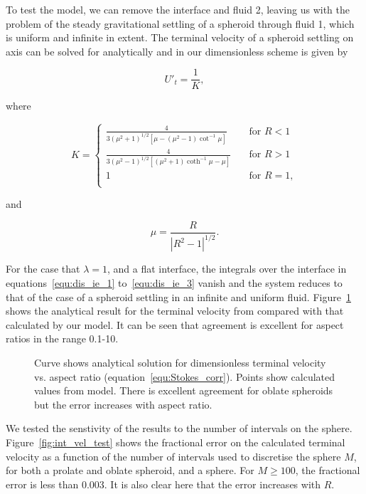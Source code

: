 \documentclass[12pt]{article}
\begin{document}
To test the model, we can remove the interface and fluid 2, leaving us with the problem of the steady gravitational settling of a spheroid through fluid 1, which is uniform and infinite in extent. The terminal velocity of a spheroid settling on axis can be solved for analytically \citep{Happel73} and in our dimensionless scheme is given by

\begin{equation}
\label{equ:term_vel}
U'_{t} = \frac{1}{K},
\end{equation}

where

\begin{equation}
\label{equ:Stokes_corr}
K = \begin{cases}
    \frac{4}{3 (\mu^{2} + 1)^{1/2} [\mu - (\mu^{2} - 1) \cot^{-1} \mu]}       & \quad \text{for } R < 1\\
    \frac{4}{3 (\mu^{2} - 1)^{1/2} [(\mu^{2} + 1) \coth^{-1}\mu - \mu]}  & \quad \text{for } R > 1\\
    1 & \quad \text{for } R = 1, \\
  \end{cases}
\end{equation}

and 

\begin{equation}
\label{equ:Stokes_const}
\mu = \frac{R}{|R^{2} - 1|^{1/2}}.
\end{equation}

For the case that $\lambda = 1$, and a flat interface, the integrals over the interface in equations~\ref{equ:dis_ie_1} to~\ref{equ:dis_ie_3} vanish and the system reduces to that of the case of a spheroid settling in an infinite and uniform fluid. Figure~\ref{fig:Happel_test} shows the analytical result for the terminal velocity from \citet{Happel73} compared with that calculated by our model. It can be seen that agreement is excellent for aspect ratios in the range 0.1-10.

  \begin{figure}
    
    \caption{Curve shows analytical solution for dimensionless terminal velocity vs. aspect ratio (equation~\ref{equ:Stokes_corr}). Points show calculated values from model. There is excellent agreement for oblate spheroids but the error increases with aspect ratio. \label{fig:Happel_test}}
  \end{figure}

We tested the senstivity of the results to the number of intervals on the sphere. Figure~\ref{fig:int_vel_test} shows the fractional error on the calculated terminal velocity as a function of the number of intervals used to discretise the sphere $M$, for both a prolate and oblate spheroid, and a sphere. For $M \geq 100$, the fractional error is less than 0.003. It is also clear here that the error increases with $R$. 
\end{document}
